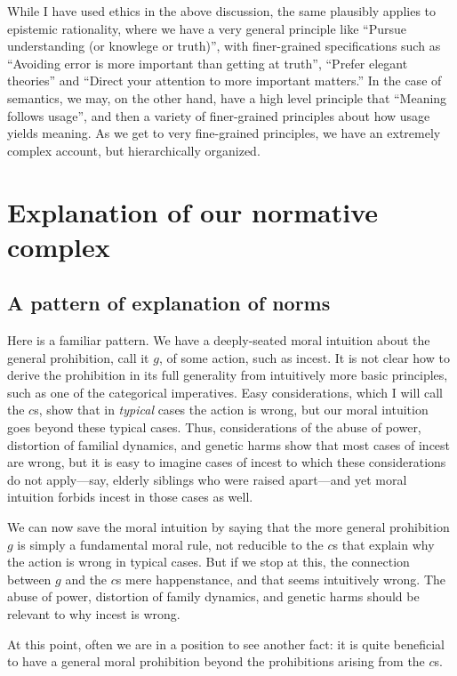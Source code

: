 While I have used ethics in the above discussion, the same plausibly applies to epistemic rationality, where we have a very general
principle like ``Pursue understanding (or knowlege or truth)'', with finer-grained specifications such as ``Avoiding error is more
important than getting at truth'', ``Prefer elegant theories'' and ``Direct your attention to more important matters.'' In the case
of semantics, we may, on the other hand, have a high level principle that ``Meaning follows usage'', and then a variety of finer-grained 
principles about how usage yields meaning. As we get to very fine-grained principles, we have an extremely complex account, but hierarchically
organized.

\section{Explanation of our normative complex}
\subsection{A pattern of explanation of norms}\label{sec:moral-explanation}
Here is a familiar pattern. We have a deeply-seated moral intuition about the general prohibition, call it $g$, of some action,
such as incest. It is not clear how to derive the prohibition in its full generality from intuitively more basic principles, such as one of 
the categorical imperatives. Easy considerations, which I will call the $c$s, show that in \textit{typical} cases the action is wrong,
but our moral intuition goes beyond these typical cases. Thus, considerations of the abuse of power, distortion of 
familial dynamics, and genetic harms show that most cases of incest are wrong, but it is easy to imagine cases
of incest to which these considerations do not apply---say, elderly siblings who were raised apart---and yet moral
intuition forbids incest in those cases as well.

We can now save the moral intuition by saying that the more general prohibition $g$ is simply a fundamental moral rule,
not reducible to the $c$s that explain why the action is wrong in typical cases. But if we stop
at this, the connection between $g$ and the $c$s mere happenstance, and that seems intuitively wrong. The abuse of 
power, distortion of family dynamics, and genetic harms should be relevant to why incest is wrong.

At this point, often we are in a position to see another fact: it is quite beneficial to have a 
general moral prohibition beyond the prohibitions arising from the $c$s. 


